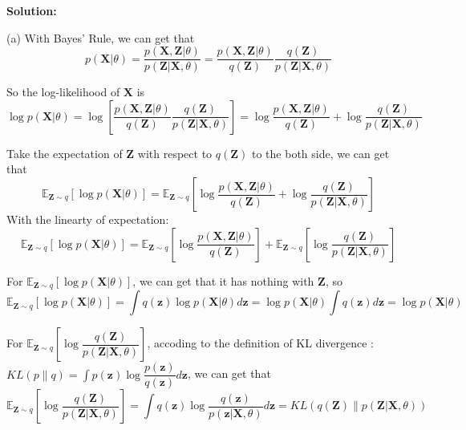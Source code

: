 \documentclass[10pt]{article}
\begin{document}
\begin{enumerate}[1.]
\begin{itemize}
     
	      \end{itemize}

		  \textbf{Solution:}

(a) With Bayes' Rule, we can get that
$$p(\boldsymbol{X}|\theta)=\dfrac{p(\boldsymbol{X},\boldsymbol{Z}|\theta)}{p(\boldsymbol{Z}|\boldsymbol{X},\theta)}
=\dfrac{p(\boldsymbol{X},\boldsymbol{Z}|\theta)}{q(\boldsymbol{Z})}\dfrac{q(\boldsymbol{Z})}{p(\boldsymbol{Z}|\boldsymbol{X},\theta)}$$

So the log-likelihood of $\boldsymbol{X}$ is
$$\log p(\boldsymbol{X}|\theta)=\log\left [\dfrac{p(\boldsymbol{X},\boldsymbol{Z}|\theta)}{q(\boldsymbol{Z})}\dfrac{q(\boldsymbol{Z})}{p(\boldsymbol{Z}|\boldsymbol{X},\theta)}\right ]
=\log\dfrac{p(\boldsymbol{X},\boldsymbol{Z}|\theta)}{q(\boldsymbol{Z})}+\log\dfrac{q(\boldsymbol{Z})}{p(\boldsymbol{Z}|\boldsymbol{X},\theta)}$$

Take the expectation of $\boldsymbol{Z}$ with respect to $q(\boldsymbol{Z})$ to the both side, we can get that
$$\mathbb{E}_{\boldsymbol{Z}\sim q}\left [\log p(\boldsymbol{X}|\theta)\right ]=\mathbb{E}_{\boldsymbol{Z}\sim q}\left [\log\dfrac{p(\boldsymbol{X},\boldsymbol{Z}|\theta)}{q(\boldsymbol{Z})}+\log\dfrac{q(\boldsymbol{Z})}{p(\boldsymbol{Z}|\boldsymbol{X},\theta)}\right ]$$
With the linearty of expectation:
$$\mathbb{E}_{\boldsymbol{Z}\sim q}\left [\log p(\boldsymbol{X}|\theta)\right ]=\mathbb{E}_{\boldsymbol{Z}\sim q}\left [\log\dfrac{p(\boldsymbol{X},\boldsymbol{Z}|\theta)}{q(\boldsymbol{Z})}\right ]+\mathbb{E}_{\boldsymbol{Z}\sim q}\left [\log\dfrac{q(\boldsymbol{Z})}{p(\boldsymbol{Z}|\boldsymbol{X},\theta)}\right ]$$

For $\mathbb{E}_{\boldsymbol{Z}\sim q}\left [\log p(\boldsymbol{X}|\theta)\right ]$, we can get that it has nothing with $\boldsymbol{Z}$, so
$$\mathbb{E}_{\boldsymbol{Z}\sim q}\left [\log p(\boldsymbol{X}|\theta)\right ]
=\int q(\boldsymbol{z})\log p(\boldsymbol{X}|\theta)d\boldsymbol{z}=\log p(\boldsymbol{X}|\theta)\int q(\boldsymbol{z})d\boldsymbol{z}
=\log p(\boldsymbol{X}|\theta)$$

For $\mathbb{E}_{\boldsymbol{Z}\sim q}\left [\log\dfrac{q(\boldsymbol{Z})}{p(\boldsymbol{Z}|\boldsymbol{X},\theta)}\right ]$,
accoding to the definition of KL divergence : $KL(p\|q)=\int p(\boldsymbol{z})\log\dfrac{p(\boldsymbol{z})}{q(\boldsymbol{z})}d\boldsymbol{z}$, we can get that
$$\mathbb{E}_{\boldsymbol{Z}\sim q}\left [\log\dfrac{q(\boldsymbol{Z})}{p(\boldsymbol{Z}|\boldsymbol{X},\theta)}\right ]
=\int q(\boldsymbol{z})\log\dfrac{q(\boldsymbol{z})}{p(\boldsymbol{z}|\boldsymbol{X},\theta)}d\boldsymbol{z}
=KL(q(\boldsymbol{Z})\|p(\boldsymbol{Z}|\boldsymbol{X},\theta))$$


\end{enumerate}
\end{document}
